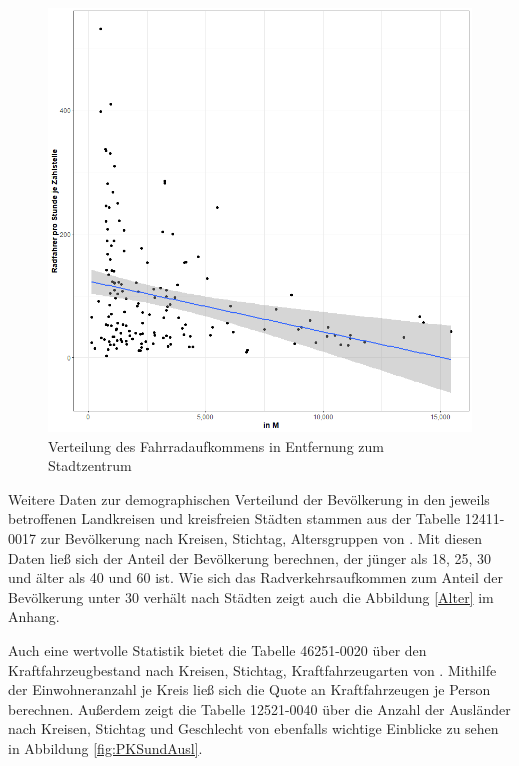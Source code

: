 \documentclass[a4paper,12pt]{thesis}
\begin{document}
\begin{figure}[!ht]
	\centering
	\includegraphics[width=\textwidth]{Plots/plot11.png}
	\caption{Verteilung des Fahrradaufkommens in Entfernung zum Stadtzentrum}
	\label{Stadtzentrum}
\end{figure}

Weitere Daten zur demographischen Verteilund der Bevölkerung in den jeweils betroffenen Landkreisen und kreisfreien Städten stammen aus der Tabelle 12411-0017 zur Bevölkerung nach Kreisen, Stichtag, Altersgruppen von \cite{Destatis2022_a}. Mit diesen Daten ließ sich der Anteil der Bevölkerung berechnen, der jünger als 18, 25, 30 und älter als 40 und 60 ist. Wie sich das Radverkehrsaufkommen zum Anteil der Bevölkerung unter 30 verhält nach Städten zeigt auch die Abbildung \ref{Alter} im Anhang.

Auch eine wertvolle Statistik bietet die Tabelle 46251-0020 über den Kraftfahrzeugbestand nach Kreisen, Stichtag, Kraftfahrzeugarten von \cite{Destatis2022b}. Mithilfe der Einwohneranzahl je Kreis ließ sich die Quote an Kraftfahrzeugen je Person berechnen. Außerdem zeigt die Tabelle 12521-0040 über die Anzahl der Ausländer nach Kreisen, Stichtag und Geschlecht von \cite{Destatis2022c} ebenfalls wichtige Einblicke zu sehen in Abbildung \ref{fig:PKSundAusl}.
\end{document}
